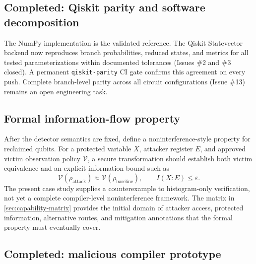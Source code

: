 \subsection{Completed: Qiskit parity and software decomposition}

The NumPy implementation is the validated reference. The Qiskit Statevector
backend now reproduces branch probabilities, reduced states, and metrics for all
tested parameterizations within documented tolerances (Issues \#2 and \#3
closed). A permanent \texttt{qiskit-parity} CI gate confirms this agreement on
every push. Complete branch-level parity across all circuit configurations
(Issue \#13) remains an open engineering task.

\subsection{Formal information-flow property}

After the detector semantics are fixed, define a noninterference-style property
for reclaimed qubits. For a protected variable $X$, attacker register $E$, and
approved victim observation policy $\mathcal{V}$, a secure transformation should
establish both victim equivalence and an explicit information bound such as
\begin{equation}
  \mathcal{V}(\rho_{\mathrm{attack}})
  \approx \mathcal{V}(\rho_{\mathrm{baseline}}),
  \qquad I(X:E)\leq\varepsilon.
\end{equation}
The present case study supplies a counterexample to histogram-only verification,
not yet a complete compiler-level noninterference framework. The matrix in
\cref{sec:capability-matrix} provides the initial domain of attacker access,
protected information, alternative routes, and mitigation annotations that the
formal property must eventually cover.

\subsection{Completed: malicious compiler prototype}

